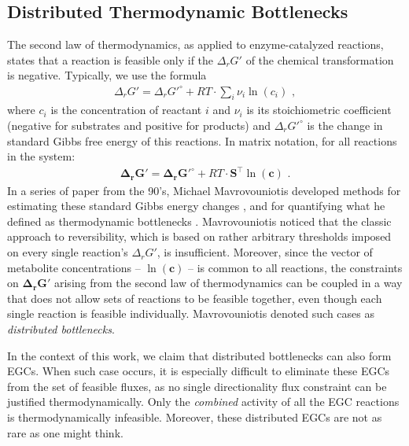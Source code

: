\documentclass[twocolumn]{bmcart}%
\begin{document}
\subsection*{Distributed Thermodynamic Bottlenecks}
The second law of thermodynamics, as applied to enzyme-catalyzed reactions, states that a reaction is feasible only if the $\Delta_r G'$ of the chemical transformation is negative. Typically, we use the formula
\begin{eqnarray}
	\Delta_r G' = \Delta_r G'^\circ + RT \cdot \sum_i \nu_i \ln(c_i)\,\,,
\end{eqnarray}
where $c_i$ is the concentration of reactant $i$ and $\nu_i$ is its stoichiometric coefficient (negative for substrates and positive for products) and $\Delta_r G'^\circ$ is the change in standard Gibbs free energy of this reactions. In matrix notation, for all reactions in the system:
\begin{eqnarray}
\mathbf{\Delta_r G'} = \mathbf{\Delta_r G'^\circ} + RT \cdot \mathbf{S}^\top \ln(\mathbf{c})\,\,.
\end{eqnarray}
In a series of paper from the 90's, Michael Mavrovouniotis developed methods for estimating these standard Gibbs energy changes \cite{Mavrovouniotis1990-wv, Mavrovouniotis1991-kf}, and for quantifying what he defined as thermodynamic bottlenecks \cite{Mavrovouniotis1993-zq, Mavrovouniotis1996-dq}. Mavrovouniotis noticed that the classic approach to reversibility, which is based on rather arbitrary thresholds imposed on every single reaction's $\Delta_r G'$, is insufficient. Moreover, since the vector of metabolite concentrations -- $\ln(\mathbf{c})$ -- is common to all reactions, the constraints on $\mathbf{\Delta_r G'}$ arising from the second law of thermodynamics can be coupled in a way that does not allow sets of reactions to be feasible together, even though each single reaction is feasible individually. Mavrovouniotis denoted such cases as \emph{distributed bottlenecks}.

In the context of this work, we claim that distributed bottlenecks can also form EGCs. When such case occurs, it is especially difficult to eliminate these EGCs from the set of feasible fluxes, as no single directionality flux constraint can be justified thermodynamically. Only the \emph{combined} activity of all the EGC reactions is thermodynamically infeasible. Moreover, these distributed EGCs are not as rare as one might think.
\end{document}
